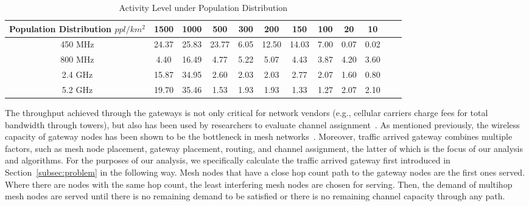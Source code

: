 \begin{table}
\centering %
\begin{tabular}{|c|c|c|c|c|c|c|c|c|c|c|c|} %
\hline %
Population Distribution $ppl/km^2$ & 1500 & 1000 & 500 & 300 &  200 & 150 & 100 & 20 & 10 \\ %
\hline %
450 MHz &24.37	&25.83  &23.77	&6.05 &12.50  &14.03 & 7.00 & 0.07 & 0.02 \\      
\hline %
800 MHz &4.40 	&16.49  &4.77	&5.22&5.07 &4.43  & 3.87 & 4.20 & 3.60 \\      
\hline %
2.4 GHz &15.87 	&34.95  &2.60	&2.03&2.03 &2.77  & 2.07 & 1.60 & 0.80 \\      
\hline %
5.2 GHz &19.70	&35.46  &1.53	&1.93&1.93 &1.33  & 1.27 & 2.07 & 2.10 \\      
\hline %
\end{tabular}    
\caption{Activity Level under Population Distribution} %
\label{tab:activitymeasurement}    
\vspace{-0.3in}
\end{table}    



The throughput achieved through the gateways is not only critical for network vendors (e.g., cellular
carriers charge fees for total bandwidth through towers), but also has been used by researchers
to evaluate channel assignment~\cite{avallone2008channel}.  As mentioned previously, the wireless
capacity of gateway nodes has been shown to be the bottleneck in mesh networks~\cite{robinson2010deploying}.
Moreover, traffic arrived gateway combines multiple factors, such as mesh node placement, gateway placement, 
routing, and channel assignment, the latter of which is the focus of our analysis and algorithms. 
For the purposes of our analysis, we specifically calculate the traffic arrived gateway first introduced
in Section~\ref{subsec:problem} in the following way.  Mesh nodes that have a close hop count path to the gateway
nodes are the first ones served. Where there are nodes with the same hop count, the least interfering
mesh nodes are chosen for serving. Then, the demand of multihop mesh nodes are served 
until there is no remaining demand to be satisfied or there is no remaining channel capacity through any path.

